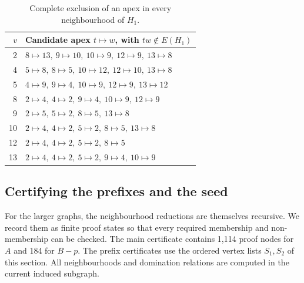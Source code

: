 \begin{table}[htbp]
\centering\small
\caption{Complete exclusion of an apex in every neighbourhood of \(H_1\).}
\label{4k4:tab:manual-prefix-negative}
\begin{tabular}{r l}\toprule
\(v\)&Candidate apex \(t\mapsto w\), with \(tw\notin E(H_1)\)\\\midrule
2 & $8\mapsto 13,\ 9\mapsto 10,\ 10\mapsto 9,\ 12\mapsto 9,\ 13\mapsto 8$\\
4 & $5\mapsto 8,\ 8\mapsto 5,\ 10\mapsto 12,\ 12\mapsto 10,\ 13\mapsto 8$\\
5 & $4\mapsto 9,\ 9\mapsto 4,\ 10\mapsto 9,\ 12\mapsto 9,\ 13\mapsto 12$\\
8 & $2\mapsto 4,\ 4\mapsto 2,\ 9\mapsto 4,\ 10\mapsto 9,\ 12\mapsto 9$\\
9 & $2\mapsto 5,\ 5\mapsto 2,\ 8\mapsto 5,\ 13\mapsto 8$\\
10 & $2\mapsto 4,\ 4\mapsto 2,\ 5\mapsto 2,\ 8\mapsto 5,\ 13\mapsto 8$\\
12 & $2\mapsto 4,\ 4\mapsto 2,\ 5\mapsto 2,\ 8\mapsto 5$\\
13 & $2\mapsto 4,\ 4\mapsto 2,\ 5\mapsto 2,\ 9\mapsto 4,\ 10\mapsto 9$\\
\bottomrule
\end{tabular}
\end{table}
\subsection{Certifying the prefixes and the seed}\label{4k4:app:certificates}
For the larger graphs, the neighbourhood reductions are themselves recursive. We record them as finite proof states so that every required membership and non-membership can be checked.
The main certificate contains 1,114 proof nodes for \(A\) and 184
for \(B-p\). The prefix certificates use the ordered vertex lists
\(S_1,S_2\) of this section.
All neighbourhoods and domination relations are computed in the
current induced subgraph.

